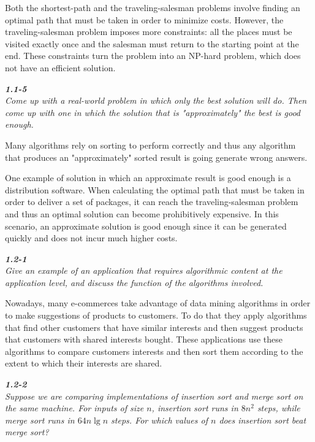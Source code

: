 \documentclass[8pt,a4paper]{article}
\begin{document}
Both the shortest-path and the traveling-salesman problems involve finding
an optimal path that must be taken in order to minimize costs. However, the
traveling-salesman problem imposes more constraints: all the places must be
visited exactly once and the salesman must return to the starting point at
the end. These constraints turn the problem into an NP-hard problem, which
does not have an efficient solution.

\begin{framed}
\textbf{\textit{1.1-5}} \\
\textit{Come up with a real-world problem in which only the best solution will
do. Then come up with one in which the solution that is "approximately" the best
is good enough.}
\end{framed}

Many algorithms rely on sorting to perform correctly and thus any algorithm
that produces an "approximately" sorted result is going generate wrong answers.

One example of solution in which an approximate result is good enough is a
distribution software. When calculating the optimal path that must be taken
in order to deliver a set of packages, it can reach the traveling-salesman
problem and thus an optimal solution can become prohibitively expensive.
In this scenario, an approximate solution is good enough since it can be
generated quickly and does not incur much higher costs.

\begin{framed}
\textbf{\textit{1.2-1}} \\
\textit{Give an example of an application that requires algorithmic content at the
application level, and discuss the function of the algorithms involved.}
\end{framed}

Nowadays, many e-commerces take advantage of data mining algorithms in order to
make suggestions of products to customers. To do that they apply algorithms
that find other customers that have similar interests and then suggest products
that customers with shared interests bought. These applications use these
algorithms to compare customers interests and then sort them according to the
extent to which their interests are shared.

\begin{framed}
\textbf{\textit{1.2-2}} \\
\textit{Suppose we are comparing implementations of insertion sort and merge sort
on the same machine. For inputs of size $n$, insertion sort runs in $8n^{2}$ steps,
while merge sort runs in $64n \lg n$ steps. For which values of $n$ does insertion
sort beat merge sort?}
\end{framed}
\end{document}
